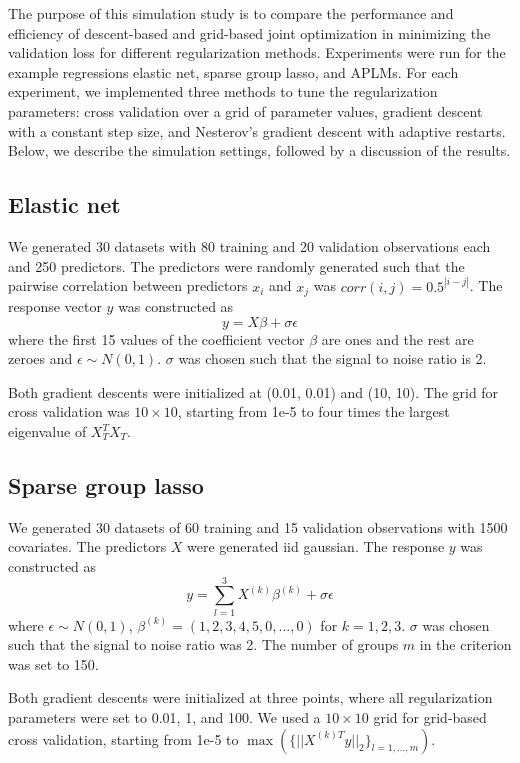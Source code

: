 \documentclass[10pt,letterpaper]{article}
\begin{document}
The purpose of this simulation study is to compare the performance and efficiency of descent-based and grid-based joint optimization in minimizing the validation loss for different regularization methods. Experiments were run for the example regressions elastic net, sparse group lasso, and APLMs. For each experiment, we implemented three methods to tune the regularization parameters: cross validation over a grid of parameter values, gradient descent with a constant step size, and Nesterov's gradient descent with adaptive restarts. Below, we describe the simulation settings, followed by a discussion of the results.

\subsection{Elastic net}
We generated 30 datasets with 80 training and 20 validation observations each and 250 predictors. The predictors were randomly generated such that the pairwise correlation between predictors $x_i$ and $x_j$ was $corr(i,j) = 0.5^{|i-j|}$. The response vector $y$ was constructed as
\begin{equation}
y = X\beta + \sigma \epsilon
\end{equation}
where the first 15 values of the coefficient vector $\beta$ are ones and the rest are zeroes and $\epsilon \sim N(0, 1)$. $\sigma$ was chosen such that the signal to noise ratio is 2. 

Both gradient descents were initialized at (0.01, 0.01) and (10, 10). The grid for cross validation was $10 \times 10$, starting from 1e-5 to four times the largest eigenvalue of $X_T^T X_T$.

\subsection{Sparse group lasso}

We generated 30 datasets of 60 training and 15 validation observations with 1500 covariates. The predictors $X$ were generated iid gaussian. The response $y$ was constructed as
\begin{equation}
y = \sum\limits_{l=1}^3 X^{(k)} \beta^{(k)} + \sigma \epsilon
\end{equation}
where $\epsilon \sim N(0, 1)$, $\beta^{(k)} = (1, 2, 3, 4, 5, 0, ..., 0)$ for $k = 1, 2, 3$. $\sigma$ was chosen such that the signal to noise ratio was 2. The number of groups $m$ in the criterion was set to 150.

Both gradient descents were initialized at three points, where all regularization parameters were set to 0.01, 1, and 100. We used a $10 \times 10$ grid for grid-based cross validation, starting from 1e-5 to $\max(\{||X^{(k)T}y ||_2\}_{l=1,..., m})$.
\end{document}
